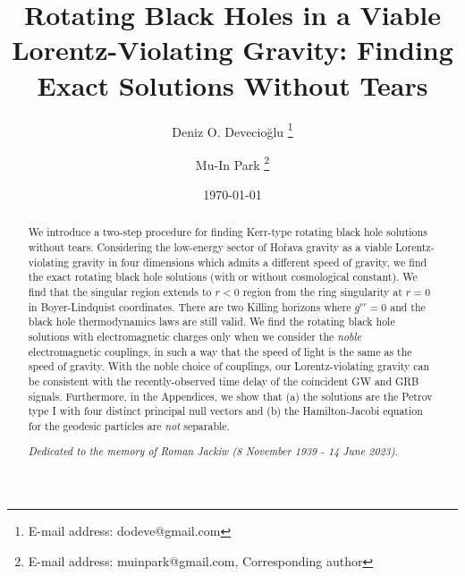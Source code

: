 \documentclass[preprint,aps,tightenlines,showkeys,nofootinbib,superscriptaddress]{revtex4}
\begin{document}

\title{Rotating Black Holes in
a Viable Lorentz-Violating Gravity:
 Finding
 Exact Solutions Without Tears
}

\author{Deniz O. Devecio\u{g}lu \footnote{E-mail address: dodeve@gmail.com}}

\author{Mu-In Park \footnote{E-mail address: muinpark@gmail.com, Corresponding author}}
\date{\today}

\begin{abstract}
We introduce a two-step procedure for finding Kerr-type rotating black hole solutions without tears.
Considering the low-energy sector of Ho\v{r}ava gravity as a viable Lorentz-violating gravity in four dimensions
which admits a different speed of gravity, we find the exact rotating black
hole solutions (with or without cosmological constant). We find that the
singular region extends to $r<0$ region from the ring singularity at $r=0$ in Boyer-Lindquist coordinates. There are two Killing horizons
where $g^{rr}=0$ and the black hole thermodynamics laws are still valid.
We find the rotating black hole solutions with electromagnetic charges
only when we consider the {\it noble} electromagnetic couplings, in
such a way that the speed of light is the same as the speed of gravity.
With the noble choice of couplings,
our Lorentz-violating gravity can be consistent with the recently-observed time delay of the coincident GW and GRB signals. Furthermore, in the  Appendices, we show that (a) the solutions are the Petrov type I with four distinct principal null vectors and (b) the Hamilton-Jacobi equation for the geodesic particles are {\it not} separable.

\bigskip
\vspace{1cm}
\noindent
    \emph
   \it{Dedicated to the memory of Roman Jackiw  (8 November 1939 - 14 June 2023).
   }

\end{abstract}

\end{document}
